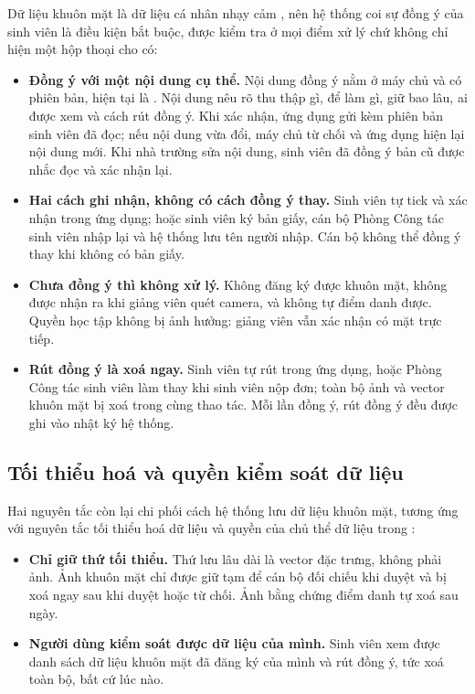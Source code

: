 Dữ liệu khuôn mặt là dữ liệu cá nhân nhạy cảm \cite{Luat912025, ND3562025}, nên hệ thống coi sự đồng ý của
sinh viên là điều kiện bắt buộc, được kiểm tra ở mọi điểm xử lý chứ không chỉ
hiện một hộp thoại cho có:

\begin{itemize}[leftmargin=1.6em, itemsep=3pt]
  \item \textbf{Đồng ý với một nội dung cụ thể.} Nội dung đồng ý nằm ở máy chủ
        và có phiên bản, hiện tại là \code{\FphienBanDongY}. Nội dung nêu rõ thu
        thập gì, để làm gì, giữ bao lâu, ai được xem và cách rút đồng ý. Khi
        xác nhận, ứng dụng gửi kèm phiên bản sinh viên đã đọc; nếu nội dung
        vừa đổi, máy chủ từ chối và ứng dụng hiện lại nội dung mới. Khi nhà
        trường sửa nội dung, sinh viên đã đồng ý bản cũ được nhắc đọc và xác
        nhận lại.
  \item \textbf{Hai cách ghi nhận, không có cách đồng ý thay.} Sinh viên tự
        tick và xác nhận trong ứng dụng; hoặc sinh viên ký bản giấy, cán bộ
        Phòng Công tác sinh viên nhập lại và hệ thống lưu tên người nhập. Cán
        bộ không thể đồng ý thay khi không có bản giấy.
  \item \textbf{Chưa đồng ý thì không xử lý.} Không đăng ký được khuôn mặt,
        không được nhận ra khi giảng viên quét camera, và không tự điểm danh
        được. Quyền học tập không bị ảnh hưởng: giảng viên vẫn xác nhận có
        mặt trực tiếp.
  \item \textbf{Rút đồng ý là xoá ngay.} Sinh viên tự rút trong ứng dụng, hoặc
        Phòng Công tác sinh viên làm thay khi sinh viên nộp đơn; toàn bộ ảnh và
        vector khuôn mặt bị xoá trong cùng thao tác. Mỗi lần đồng ý, rút đồng
        ý đều được ghi vào nhật ký hệ thống.
\end{itemize}

\subsection{Tối thiểu hoá và quyền kiểm soát dữ liệu}

Hai nguyên tắc còn lại chi phối cách hệ thống lưu dữ liệu khuôn mặt, tương ứng
với nguyên tắc tối thiểu hoá dữ liệu và quyền của chủ thể dữ liệu trong
\cite{GDPR2016}:

\begin{itemize}[leftmargin=1.6em, itemsep=3pt]
  \item \textbf{Chỉ giữ thứ tối thiểu.} Thứ lưu lâu dài là vector đặc trưng,
        không phải ảnh. Ảnh khuôn mặt chỉ được giữ tạm để cán bộ đối chiếu
        khi duyệt và bị xoá ngay sau khi duyệt hoặc từ chối. Ảnh bằng chứng
        điểm danh tự xoá sau \FngayLuuAnh{} ngày.
  \item \textbf{Người dùng kiểm soát được dữ liệu của mình.} Sinh viên xem
        được danh sách dữ liệu khuôn mặt đã đăng ký của mình và rút đồng ý,
        tức xoá toàn bộ, bất cứ lúc nào.
\end{itemize}

